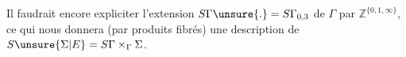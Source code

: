 
Il faudrait encore expliciter l'extension $S\Gamma\unsure{.}=S\Gamma_{0,3}$ de $\Gamma$ par $\mathbb Z^{\{0,1,\infty\}}$, ce qui nous donnera (par produits fibrés) une description de $S\unsure{\Sigma|E}=S\Gamma\times_\Gamma\Sigma$.
